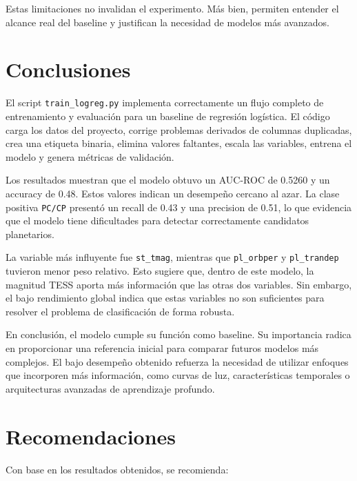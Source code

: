 \documentclass[12pt,letterpaper]{article}
\begin{document}
Estas limitaciones no invalidan el experimento. Más bien, permiten entender el alcance real del baseline y justifican la necesidad de modelos más avanzados.

\section{Conclusiones}

El script \texttt{train\_logreg.py} implementa correctamente un flujo completo de entrenamiento y evaluación para un baseline de regresión logística. El código carga los datos del proyecto, corrige problemas derivados de columnas duplicadas, crea una etiqueta binaria, elimina valores faltantes, escala las variables, entrena el modelo y genera métricas de validación.

Los resultados muestran que el modelo obtuvo un AUC-ROC de 0.5260 y un accuracy de 0.48. Estos valores indican un desempeño cercano al azar. La clase positiva \texttt{PC/CP} presentó un recall de 0.43 y una precision de 0.51, lo que evidencia que el modelo tiene dificultades para detectar correctamente candidatos planetarios.

La variable más influyente fue \texttt{st\_tmag}, mientras que \texttt{pl\_orbper} y \texttt{pl\_trandep} tuvieron menor peso relativo. Esto sugiere que, dentro de este modelo, la magnitud TESS aporta más información que las otras dos variables. Sin embargo, el bajo rendimiento global indica que estas variables no son suficientes para resolver el problema de clasificación de forma robusta.

En conclusión, el modelo cumple su función como baseline. Su importancia radica en proporcionar una referencia inicial para comparar futuros modelos más complejos. El bajo desempeño obtenido refuerza la necesidad de utilizar enfoques que incorporen más información, como curvas de luz, características temporales o arquitecturas avanzadas de aprendizaje profundo.

\section{Recomendaciones}

Con base en los resultados obtenidos, se recomienda:
\end{document}
